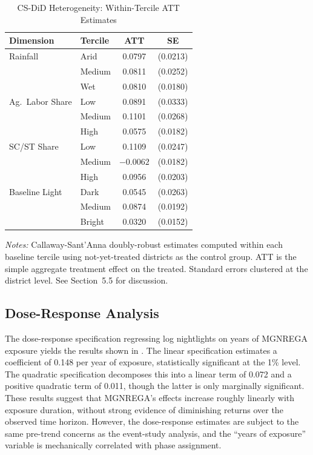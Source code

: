 \documentclass[12pt]{article}
\begin{document}
\begin{table}[htbp]
\centering
\caption{CS-DiD Heterogeneity: Within-Tercile ATT Estimates}
\label{tab:csdid_het}
\begin{tabular}{llcc}
\hline\hline
Dimension & Tercile & ATT & SE \\
\hline
Rainfall & Arid & 0.0797 & (0.0213) \\
 & Medium & 0.0811 & (0.0252) \\
 & Wet & 0.0810 & (0.0180) \\
\addlinespace
Ag.\ Labor Share & Low & 0.0891 & (0.0333) \\
 & Medium & 0.1101 & (0.0268) \\
 & High & 0.0575 & (0.0182) \\
\addlinespace
SC/ST Share & Low & 0.1109 & (0.0247) \\
 & Medium & $-0.0062$ & (0.0182) \\
 & High & 0.0956 & (0.0203) \\
\addlinespace
Baseline Light & Dark & 0.0545 & (0.0263) \\
 & Medium & 0.0874 & (0.0192) \\
 & Bright & 0.0320 & (0.0152) \\
\hline\hline
\end{tabular}
\begin{tablenotes}[flushleft]\small
\item \textit{Notes:} Callaway-Sant'Anna doubly-robust estimates computed within each baseline tercile using not-yet-treated districts as the control group. ATT is the simple aggregate treatment effect on the treated. Standard errors clustered at the district level. See Section~5.5 for discussion.
\end{tablenotes}
\end{table}

\subsection{Dose-Response Analysis}
\label{app:dose_response}

The dose-response specification regressing log nightlights on years of MGNREGA exposure yields the results shown in . The linear specification estimates a coefficient of 0.148 per year of exposure, statistically significant at the 1\% level. The quadratic specification decomposes this into a linear term of 0.072 and a positive quadratic term of 0.011, though the latter is only marginally significant. These results suggest that MGNREGA's effects increase roughly linearly with exposure duration, without strong evidence of diminishing returns over the observed time horizon. However, the dose-response estimates are subject to the same pre-trend concerns as the event-study analysis, and the ``years of exposure'' variable is mechanically correlated with phase assignment.
\end{document}
